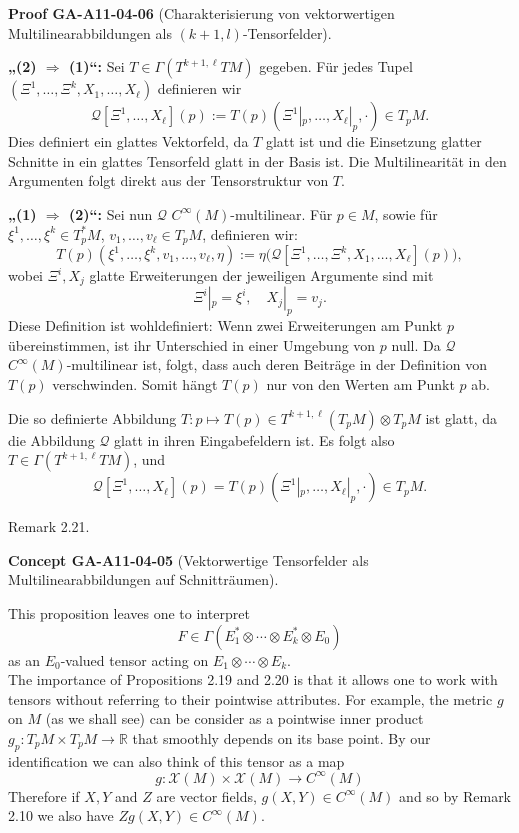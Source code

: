 \documentclass[10pt, letterpaper]{article}
\newcommand{\CustomHeading}[3]{%
  \par\medskip\noindent%
  \textbf{#1 #2} \textnormal{(#3)}.\enskip%
}
\newenvironment{CONC}[2]{\begin{unitbox}\CustomHeading{Concept}{#1}{#2}}{\end{unitbox}}
\newenvironment{PROOF}[2]{\begin{unitbox}\CustomHeading{Proof}{#1}{#2}}{\end{unitbox}}
\begin{document}
\begin{PROOF}{GA-A11-04-06}{Charakterisierung von vektorwertigen Multilinearabbildungen als $(k+1,l)$-Tensorfelder}
\textbf{„(2) \(\Rightarrow\) (1)“:} Sei \( T \in \Gamma(T^{k+1,\ell}TM) \) gegeben. Für jedes Tupel \( (\Xi^1,\dots,\Xi^k,X_1,\dots,X_\ell) \) definieren wir
\[
\mathcal{Q}[\Xi^1,\dots,X_\ell](p) := T(p)(\Xi^1|_p,\dots,X_\ell|_p,\cdot) \in T_pM.
\]
Dies definiert ein glattes Vektorfeld, da \( T \) glatt ist und die Einsetzung glatter Schnitte in ein glattes Tensorfeld glatt in der Basis ist. Die Multilinearität in den Argumenten folgt direkt aus der Tensorstruktur von \( T \).

\medskip

\textbf{„(1) \(\Rightarrow\) (2)“:} Sei nun \( \mathcal{Q} \) \( C^\infty(M) \)-multilinear. Für \( p \in M \), sowie für \( \xi^1,\dots,\xi^k \in T_p^*M \), \( v_1,\dots,v_\ell \in T_pM \), definieren wir:
\[
T(p)(\xi^1,\dots,\xi^k,v_1,\dots,v_\ell,\eta) := \eta\big( \mathcal{Q}[\Xi^1,\dots,\Xi^k,X_1,\dots,X_\ell](p) \big),
\]
wobei \( \Xi^i, X_j \) glatte Erweiterungen der jeweiligen Argumente sind mit
\[
\Xi^i|_p = \xi^i, \quad X_j|_p = v_j.
\]
Diese Definition ist wohldefiniert: Wenn zwei Erweiterungen am Punkt \( p \) übereinstimmen, ist ihr Unterschied in einer Umgebung von \( p \) null. Da \( \mathcal{Q} \) \( C^\infty(M) \)-multilinear ist, folgt, dass auch deren Beiträge in der Definition von \( T(p) \) verschwinden. Somit hängt \( T(p) \) nur von den Werten am Punkt \( p \) ab.

Die so definierte Abbildung \( T: p \mapsto T(p) \in T^{k+1,\ell}(T_p M) \otimes T_p M \) ist glatt, da die Abbildung \( \mathcal{Q} \) glatt in ihren Eingabefeldern ist. Es folgt also \( T \in \Gamma(T^{k+1,\ell} TM) \), und
\[
\mathcal{Q}[\Xi^1,\dots,X_\ell](p) = T(p)(\Xi^1|_p,\dots,X_\ell|_p,\cdot) \in T_p M.
\]
\end{PROOF}





Remark 2.21. 

\begin{CONC}{GA-A11-04-05}{Vektorwertige Tensorfelder als Multilinearabbildungen auf Schnitträumen}
This proposition leaves one to interpret
$$
F \in \Gamma\left(E_{1}^{*} \otimes \cdots \otimes E_{k}^{*} \otimes E_{0}\right)
$$
as an $E_{0}$-valued tensor acting on $E_{1} \otimes \cdots \otimes E_{k}$.\\
The importance of Propositions 2.19 and 2.20 is that it allows one to work with tensors without referring to their pointwise attributes. For example, the metric $g$ on $M$ (as we shall see) can be consider as a pointwise inner product $g_{p}: T_{p} M \times T_{p} M \rightarrow \mathbb{R}$ that smoothly depends on its base point. By our identification we can also think of this tensor as a map
$$
g: \mathscr{X}(M) \times \mathscr{X}(M) \rightarrow C^{\infty}(M)
$$
Therefore if $X, Y$ and $Z$ are vector fields, $g(X, Y) \in C^{\infty}(M)$ and so by Remark 2.10 we also have $Z g(X, Y) \in C^{\infty}(M)$.
\end{CONC}
\end{document}
